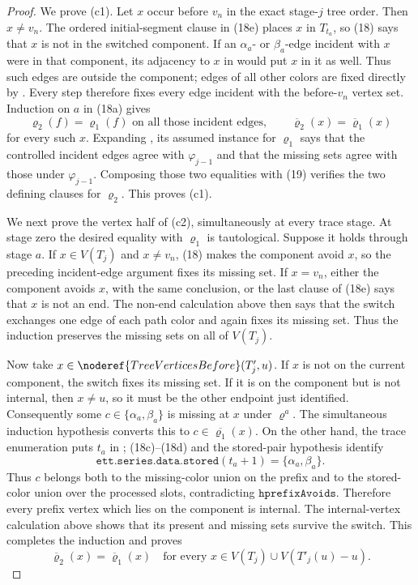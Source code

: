 \begin{proof}
We prove (c1).  Let \(x\) occur before \(v_n\) in the exact stage-\(j\)
tree order.  Then \(x\ne v_n\).  The ordered initial-segment clause in
(18e) places \(x\) in \(T_{t_a}\), so (18) says that \(x\) is not in the
switched component.  If an \(\alpha_a\)- or \(\beta_a\)-edge incident
with \(x\) were in that component, its adjacency to \(x\) in
 would put \(x\) in it as well.  Thus
such edges are outside the component; edges of all other colors are fixed
directly by .  Every step therefore fixes
every edge incident with the before-\(v_n\) vertex set.  Induction on \(a\)
in (18a) gives
\[
 \varrho_2(f)=\varrho_1(f)\text{ on all those incident edges},
 \qquad
 \overline\varrho_2(x)=\overline\varrho_1(x)               \tag{19}
\]
for every such \(x\).  Expanding
, its assumed instance for
\(\varrho_1\) says that the controlled incident edges agree with
\(\varphi_{j-1}\) and that the missing sets agree with those under
\(\varphi_{j-1}\).  Composing those two equalities with (19) verifies the
two defining clauses for \(\varrho_2\).  This proves (c1).

We next prove the vertex half of (c2), simultaneously at every trace
stage.  At stage zero the desired equality with \(\varrho_1\) is
tautological.  Suppose it holds through stage \(a\).  If
\(x\in V(T_j)\) and \(x\ne v_n\), (18) makes the component avoid \(x\),
so the preceding incident-edge argument fixes its missing set.  If
\(x=v_n\), either the component avoids \(x\), with the same conclusion,
or the last clause of (18e) says that \(x\) is not an end.  The non-end
calculation above then says that the switch exchanges one edge of each
path color and again fixes its missing set.  Thus the induction preserves
the missing sets on all of \(V(T_j)\).

Now take \(x\in\noderef{TreeVerticesBefore}(T'_j,u)\).  If \(x\) is not
on the current component, the switch fixes its missing set.  If it is on
the component but is not internal, then \(x\ne u\), so it must be the
other endpoint just identified.  Consequently some
\(c\in\{\alpha_a,\beta_a\}\) is missing at \(x\) under \(\varrho^a\).
The simultaneous induction hypothesis converts this to
\(c\in\overline{\varrho_1}(x)\).  On the other hand, the trace enumeration
puts \(t_a\) in ; (18c)--(18d) and
the stored-pair hypothesis identify
\[
 \mathtt{ett.series.data.stored}(t_a+1)
       =\{\alpha_a,\beta_a\}.
\]
Thus \(c\) belongs both to the missing-color union on the prefix and to
the stored-color union over the processed slots, contradicting
\(\mathtt{hprefixAvoids}\).  Therefore every prefix vertex which lies on
the component is internal.  The internal-vertex calculation above shows
that its present and missing sets survive the switch.  This completes the
induction and proves
\[
 \overline\varrho_2(x)=\overline\varrho_1(x)
 \quad\text{for every }x\in V(T_j)\cup V(T'_j(u)-u).         \tag{20}
\]


\end{proof}
